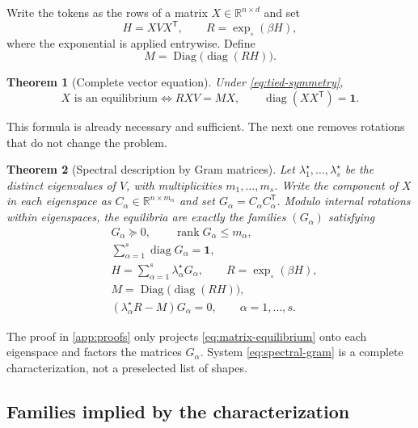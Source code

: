 \documentclass[11pt,a4paper]{article}
\newtheorem{theorem}{Theorem}[section]
\theoremstyle{definition}
\newcommand{\R}{\mathbb R}
\newcommand{\diag}{\operatorname{diag}}
\newcommand{\Diag}{\operatorname{Diag}}
\newcommand{\rank}{\operatorname{rank}}
\newcommand{\T}{\mathsf T}
\newcommand{\one}{\bm 1}
\begin{document}
Write the tokens as the rows of a matrix $X\in\R^{n\times d}$ and set
\[
 H=XVX^{\T},\qquad R=\exp_\circ(\beta H),
\]
where the exponential is applied entrywise. Define
\[
 M=\Diag\bigl(\diag(RH)\bigr).
\]

\begin{theorem}[Complete vector equation]
\label{thm:vector-complete}
Under \eqref{eq:tied-symmetry},
\begin{equation}
 \boxed{\quad X\text{ is an equilibrium}
 \iff RXV=MX,\qquad \diag(XX^{\T})=\one.\quad}              \label{eq:matrix-equilibrium}
\end{equation}
\end{theorem}

This formula is already necessary and sufficient. The next one removes rotations that
do not change the problem.

\begin{theorem}[Spectral description by Gram matrices]
\label{thm:spectral-gram}
Let $\lambda_1^\star,\ldots,\lambda_s^\star$ be the distinct eigenvalues of $V$, with
multiplicities $m_1,\ldots,m_s$. Write the component of $X$ in each eigenspace as
$C_\alpha\in\R^{n\times m_\alpha}$ and set $G_\alpha=C_\alpha C_\alpha^{\T}$.
Modulo internal rotations within eigenspaces, the equilibria are exactly the families
$(G_\alpha)$ satisfying
\begin{equation}
\boxed{
\begin{aligned}
 &G_\alpha\succeq0,\qquad \rank G_\alpha\le m_\alpha,\\
 &\sum_{\alpha=1}^s\diag G_\alpha=\one,\\
 &H=\sum_{\alpha=1}^s\lambda_\alpha^\star G_\alpha,
 \qquad R=\exp_\circ(\beta H),\\
 &M=\Diag\bigl(\diag(RH)\bigr),\\
 &(\lambda_\alpha^\star R-M)G_\alpha=0,
 \qquad \alpha=1,\ldots,s.
\end{aligned}}                                             \label{eq:spectral-gram}
\end{equation}
\end{theorem}

The proof in \cref{app:proofs} only projects \eqref{eq:matrix-equilibrium} onto each
eigenspace and factors the matrices $G_\alpha$. System \eqref{eq:spectral-gram} is a
complete characterization, not a preselected list of shapes.

\subsection{Families implied by the characterization}
\end{document}
